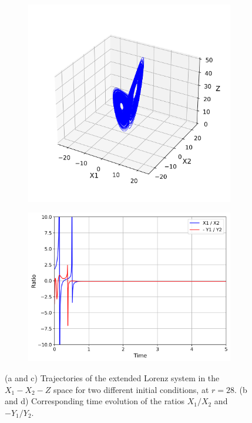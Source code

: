 \documentclass[paper=a4, fontsize=11pt]{scrartcl}
\numberwithin{equation}{section}		%
\numberwithin{figure}{section}			%
\numberwithin{table}{section}				%
\begin{document}
\begin{figure}[hbt!]
\begin{subfigure}[b]{0.495\textwidth}
		\caption{}
		\label{fig:sub2}
	\end{subfigure}
		\hfill
	\begin{subfigure}[b]{0.495\textwidth}
		\centering
		\includegraphics[width=\textwidth]{media/extendedattractor_seed_45.png}
		\caption{}
		\label{fig:sub2}
	\end{subfigure}
	\hfill
	\begin{subfigure}[b]{0.495\textwidth}
		\centering
		\includegraphics[width=\textwidth]{media/X1_X2_Y1_Y2_vs_time_seed_45.png}
		\caption{}
		\label{fig:sub2}
	\end{subfigure}
	
	\caption{(a and c) Trajectories of the extended Lorenz system in the $X_1-X_2-Z$ space for two different initial conditions, at $r=28$. (b and d) Corresponding time evolution of the ratios $X_1/X_2$ and $-Y_1/Y_2$.}
	\label{fig:extendedsimulations}
\end{figure}
\end{document}
